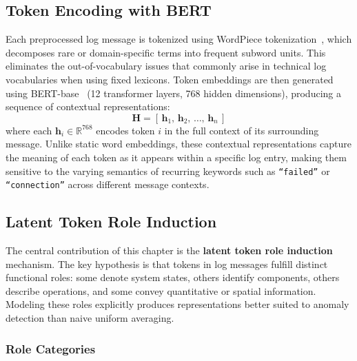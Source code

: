 \subsection{Token Encoding with BERT}

Each preprocessed log message is tokenized using WordPiece tokenization~\cite{schuster2012japanese}, which decomposes rare or domain-specific terms into frequent subword units. This eliminates the out-of-vocabulary issues that commonly arise in technical log vocabularies when using fixed lexicons. Token embeddings are then generated using BERT-base~\cite{devlin2018bert} (12 transformer layers, 768 hidden dimensions), producing a sequence of contextual representations:
\begin{equation}
\mathbf{H} = [\,\mathbf{h}_1,\, \mathbf{h}_2,\, \ldots,\, \mathbf{h}_n\,]
\end{equation}
where each $\mathbf{h}_i \in \mathbb{R}^{768}$ encodes token $i$ in the full context of its surrounding message. Unlike static word embeddings, these contextual representations capture the meaning of each token as it appears within a specific log entry, making them sensitive to the varying semantics of recurring keywords such as \texttt{``failed''} or \texttt{``connection''} across different message contexts.

\subsection{Latent Token Role Induction}

The central contribution of this chapter is the \textbf{latent token role induction} mechanism. The key hypothesis is that tokens in log messages fulfill distinct functional roles: some denote system states, others identify components, others describe operations, and some convey quantitative or spatial information. Modeling these roles explicitly produces representations better suited to anomaly detection than naive uniform averaging.

\subsubsection{Role Categories}

